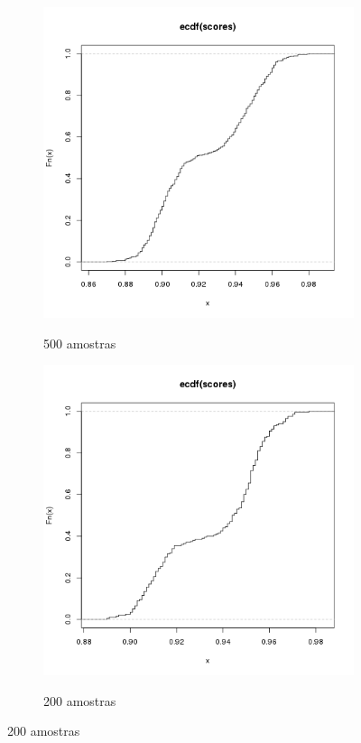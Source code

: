 \documentclass[11pt,a4paper]{article}
\begin{document}
\begin{figure}[H]
    \caption{ECDFs - Nexus 7, Android 4.3 Chrome}
    \label{nexus43ecdfs}
    \begin{subfigure}{.5\textwidth}
        \caption{500 amostras}
        \centering
        \includegraphics[width=\textwidth]{images/ecdf-n7-a43-chrome-500-amostras-20131119}
        \label{nexus43500}
    \end{subfigure}
    \begin{subfigure}{.5\textwidth}
        \caption{200 amostras}
        \centering
        \includegraphics[width=\textwidth]{images/ecdf-n7-a43-chrome-200-amostras-20131120}
        \label{nexus43200}
    \end{subfigure}
\end{figure}
\end{document}
